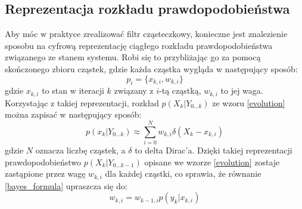 \documentclass[10pt,a4paper]{article}
\begin{document}
\subsection{Reprezentacja rozkładu prawdopodobieństwa}
Aby móc w praktyce zrealizować filtr cząsteczkowy, konieczne jest znalezienie sposobu na cyfrową reprezentację ciągłego rozkładu prawdopodobieństwa związanego ze stanem systemu. Robi się to przybliżając go za pomocą skończonego zbioru cząstek, gdzie każda cząstka wygląda w następujący sposób:
\begin{equation*}
	p_i=\{x_{k,i},w_{k,i}\}
\end{equation*}
gdzie $x_{k,i}$ to stan w iteracji $k$ związany z $i$-tą cząstką, $w_{k,i}$ to jej waga. Korzystając z takiej reprezentacji, rozkład $p(X_k|Y_{0...k})$ ze wzoru \ref{evolution} można zapisać w następujący sposób:
\begin{equation}
	p(x_k|Y_{0...k})\approx \sum_{i=0}^{N} w_{k,i}	\delta(X_k-x_{k,i})
\end{equation}
gdzie $N$ oznacza liczbę cząstek, a $\delta$ to delta Dirac'a. Dzięki takiej reprezentacji prawdopodobieństwo $p(X_k|Y_{0...k-1})$ opisane we wzorze \ref{evolution} zostaje zastąpione przez wagę $w_{k,i}$ dla każdej cząstki, co sprawia, że równanie \ref{bayes_formula} upraszcza się do:
\begin{equation}\label{weight_update}
	w_{k,i} = w_{k-1,i} p(y_k|x_{k,i})
\end{equation}

\end{document}
